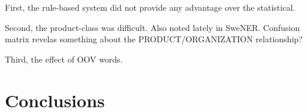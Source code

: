 \documentclass[11pt]{article}
\begin{document}
First, the rule-based system did not provide any advantage over the statistical.

Second, the product-class was difficult. Also noted lately in SweNER. Confusion matrix revelas something about the PRODUCT/ORGANIZATION relationship?

Third, the effect of OOV words.




\section{Conclusions}
\label{sec: conclusions}





\newpage

%

\end{document}
